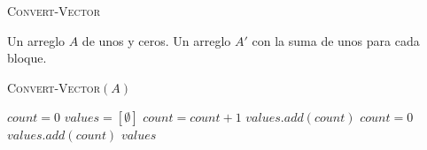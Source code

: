 \documentclass[conference]{IEEEtran}
\begin{document}
\newpage

\begin{algorithm}
\caption{\textsc{Convert-Vector}}
\begin{algorithmic}
\REQUIRE Un arreglo $A$ de unos y ceros.
\ENSURE Un arreglo $A'$ con la suma de unos para cada bloque.
\begin{flushleft}
\textsc{Convert-Vector}$(A)$
\end{flushleft}
    \STATE $count=0$
    \STATE $values=[\emptyset]$
            \STATE $count=count+1$
        \ELSE
                \STATE $values.add(count)$
                \STATE $count=0$
            \ENDIF
        \ENDIF
    \ENDFOR
        \STATE $values.add(count)$
    \ENDIF
    \RETURN $values$
\end{algorithmic}
\end{algorithm}
\end{document}
